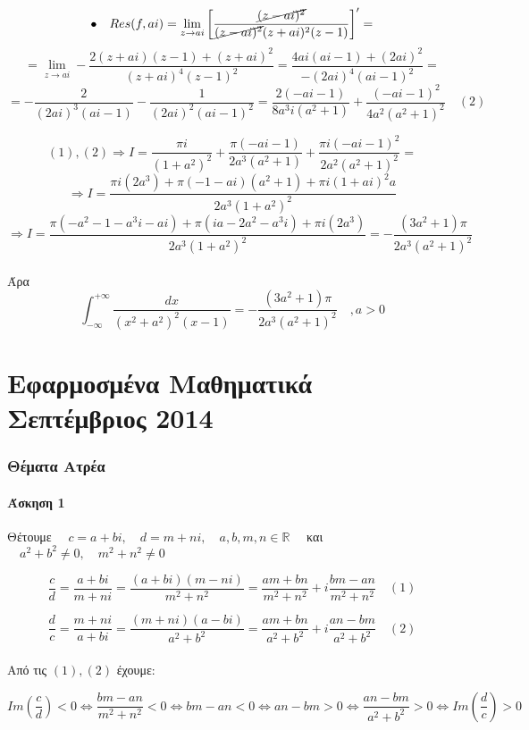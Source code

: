\documentclass[12pt]{article}
\begin{document}
$$
\bullet\quad Res(f,ai)=\lim_{z \rightarrow ai}\left[\frac{\cancel{(z-ai)^2}}{\cancel{(z-ai)^2}(z+ai)^2(z-1)}\right]'=
$$
$$=\lim_{z \rightarrow ai}-\frac{2(z+ai)(z-1)+(z+ai)^2}{(z+ai)^4(z-1)^2}=
\frac{4ai(ai-1)+(2ai)^2}{-(2ai)^4(ai-1)^2}=
$$
$$
=-\frac{2}{(2ai)^3(ai-1)}-\frac{1}{(2ai)^2(ai-1)^2}=
\frac{2(-ai-1)}{8a^3i(a^2+1)}+\frac{(-ai-1)^2}{4a^2(a^2+1)^2}\quad(2)$$

$$
(1),(2) \Rightarrow 
I =  \frac{\pi i}{(1+a^2)^2}+\frac{\pi(-ai-1)}{2a^3(a^2+1)}+\frac{\pi i(-ai-1)^2}{2a^2(a^2+1)^2}=
$$
$$
\Rightarrow I=
\frac{\pi i(2a^3)+\pi(-1-ai)(a^2+1)+\pi i(1+ai)^2a}{2a^3(1+a^2)^2}
$$
$$
\Rightarrow I=
\frac{\pi(-a^2-1-a^3i-ai)+\pi(ia-2a^2-a^3i)+\pi i(2a^3)}
{2a^3(1+a^2)^2}=-\frac{(3a^2+1)\pi}{2a^3(a^2+1)^2}
$$
\\
Άρα 
$$\int_{-\infty}^{+\infty}\frac{dx}{(x^2+a^2)^2(x-1)} =-\frac{(3a^2+1)\pi}{2a^3(a^2+1)^2} \quad,a>0 $$
 

\newpage \part{Εφαρμοσμένα Μαθηματικά Σεπτέμβριος 2014}
\author{}


  

\maketitle
\newpage
 

 \section{Θέματα Ατρέα}
 \subsection{Άσκηση 1}

Θέτουμε $\quad c=a+bi ,\quad d=m+ni , \quad a,b,m,n \in \mathbb{R} \quad $ και \\
$ \quad a^2+b^2\neq 0 , \quad m^2+n^2\neq 0 $

$$ \frac{c}{d}=\frac{a+bi}{m+ni}=\frac{(a+bi)(m-ni)}{m^2+n^2}=\frac{am+bn}{m^2+n^2} + i \frac{bm-an}{m^2+n^2} \quad (1)  $$

$$ \frac{d}{c}=\frac{m+ni}{a+bi}=\frac{(m+ni)(a-bi)}{a^2+b^2}=\frac{am+bn}{a^2+b^2} + i \frac{an-bm}{a^2+b^2} \quad (2) $$
\\
Από τις $(1),(2)$ έχουμε:

$$ Im\left(\frac{c}{d}\right) < 0 \Leftrightarrow  
\frac{bm-an}{m^2+n^2}<0 \Leftrightarrow bm-an<0 \Leftrightarrow
an-bm>0
\Leftrightarrow
\frac{an-bm}{a^2+b^2}>0 
\Leftrightarrow 
Im\left(\frac{d}{c}\right) > 0
$$
\end{document}
